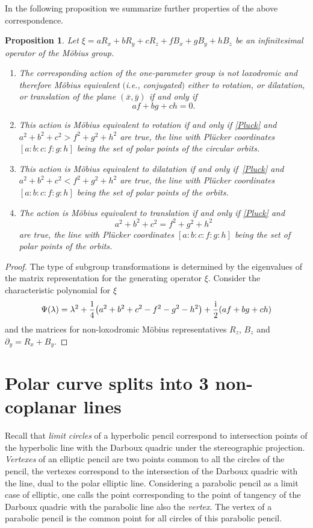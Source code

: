 \documentclass[pdftex]{sigma}
\numberwithin{equation}{section}
\newtheorem{Proposition}[Theorem]{Proposition}
 { \theoremstyle{definition}
\newtheorem{Definition}[Theorem]{Definition}
\newtheorem{Note}[Theorem]{Note}
\newtheorem{Example}[Theorem]{Example}
\newtheorem{Remark}[Theorem]{Remark} }
\begin{document}
In the following proposition we summarize further properties of the above correspondence.
\begin{Proposition}\label{operline}
Let $\xi =aR_x+bR_y+cR_z+fB_x+gB_y+hB_z$ be an infinitesimal operator of the M\"obius group.
\begin{enumerate}\itemsep=0pt
\item[$(1)$] The corresponding action of the one-parameter group is not loxodromic and therefore M\"obius equivalent $($i.e., conjugated$)$ either to rotation, or dilatation, or translation of the plane $(\bar{x},\bar{y})$ if and only if \begin{equation}\label{Pluck}
af+bg+ch=0.
\end{equation}
\item[$(2)$] This action is M\"obius equivalent to rotation if and only if \eqref{Pluck} and
$a^2+b^2+c^2>f^2+g^2+h^2$ are true, the line with Pl\"ucker coordinates $[a:b:c:f:g:h]$ being the set of polar points of the circular orbits.
\item[$(3)$] This action is M\"obius equivalent to dilatation if and only if~\eqref{Pluck} and
$a^2+b^2+c^2<f^2+g^2+h^2$ are true, the line with Pl\"ucker coordinates $[a:b:c:f:g:h]$ being the set of polar points of the orbits.
\item[$(4)$] The action is M\"obius equivalent to translation if and only if \eqref{Pluck} and
\begin{equation}\label{quadrcomplex}
a^2+b^2+c^2=f^2+g^2+h^2
\end{equation} are true, the line with Pl\"ucker coordinates $[a:b:c:f:g:h]$ being the set of polar points of the orbits.
\end{enumerate}
\end{Proposition}
\begin{proof}
The type of subgroup transformations is determined by the eigenvalues of the matrix representation for the generating operator $\xi$. Consider the characteristic polynomial for $\xi$
\[
\Psi (\lambda)=\lambda^2 +\frac{1}{4}\bigl( a^2 + b^2 + c^2 - f^2 - g^2 - h^2\bigr)+\frac{\rm i}{2}(af + bg +ch)
\]
and the matrices for non-loxodromic M\"obius representatives $R_z$, $B_z$ and $\partial_y=R_x+B_y$.
\end{proof}


\section{Polar curve splits into 3 non-coplanar lines}
Recall that {\it limit circles} of a hyperbolic pencil correspond to intersection points of the hyperbolic line with the Darboux quadric under the stereographic projection. {\it Vertexes} of an elliptic pencil are two points common to all the circles of the pencil, the vertexes correspond to the intersection of the Darboux quadric with the line, dual to the polar elliptic line. Considering a parabolic pencil as a limit case of elliptic, one calls the point corresponding to the point of tangency of the Darboux quadric with the parabolic line also the {\it vertex}. The vertex of a parabolic pencil is the common point for all circles of this parabolic pencil.
\end{document}
